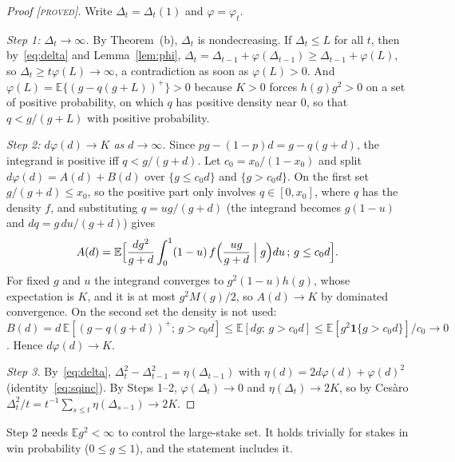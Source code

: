 \documentclass[aoas]{imsart}
\theoremstyle{plain}
\theoremstyle{definition}
\newcommand{\E}{\mathbb{E}}
\newcommand{\status}[1]{\textup{[\textsc{#1}]}}
\begin{document}
\begin{proof}[Proof \status{proved}]
Write $\Delta_t=\Delta_t(1)$ and $\varphi=\varphi_t$.

\emph{Step 1: $\Delta_t\to\infty$.} By Theorem~(b), $\Delta_t$ is nondecreasing. If $\Delta_t\le L$
for all $t$, then by~\eqref{eq:delta} and Lemma~\ref{lem:phi}, $\Delta_t=\Delta_{t-1}+\varphi(\Delta_{t-1})\ge
\Delta_{t-1}+\varphi(L)$, so $\Delta_t\ge t\varphi(L)\to\infty$, a contradiction as soon as $\varphi(L)>0$. And
$\varphi(L)=\E\{(g-q(g+L))^+\}>0$ because $K>0$ forces $h(g)g^2>0$ on a set of positive probability, on which $q$ has
positive density near $0$, so that $q<g/(g+L)$ with positive probability.

\emph{Step 2: $d\varphi(d)\to K$ as $d\to\infty$.} Since $pg-(1-p)d=g-q(g+d)$, the integrand is positive iff
$q<g/(g+d)$. Let $c_0=x_0/(1-x_0)$ and split $d\varphi(d)=A(d)+B(d)$ over $\{g\le c_0d\}$ and $\{g>c_0d\}$. On the
first set $g/(g+d)\le x_0$, so the positive part only involves $q\in[0,x_0]$, where $q$ has the density $f$, and
substituting $q=ug/(g+d)$ (the integrand becomes $g(1-u)$ and $dq=g\,du/(g+d)$) gives
\[ A(d)=\E\Bigl[\frac{dg^2}{g+d}\int_0^1(1-u)\,f\Bigl(\frac{ug}{g+d}\Bigm| g\Bigr)du\,;\,g\le c_0d\Bigr]. \]
For fixed $g$ and $u$ the integrand converges to $g^2(1-u)h(g)$, whose expectation is $K$, and it is at most
$g^2M(g)/2$, so $A(d)\to K$ by dominated convergence. On the second set the density is not used:
$B(d)=d\,\E[(g-q(g+d))^+;\,g>c_0d]\le\E[dg;\,g>c_0d]\le\E[g^2\mathbf1\{g>c_0d\}]/c_0\to0$. Hence $d\varphi(d)\to K$.

\emph{Step 3.} By~\eqref{eq:delta}, $\Delta_t^2-\Delta_{t-1}^2=\eta(\Delta_{t-1})$ with
$\eta(d)=2d\varphi(d)+\varphi(d)^2$ (identity~\eqref{eq:sqinc}). By Steps 1--2, $\varphi(\Delta_t)\to0$ and
$\eta(\Delta_t)\to2K$, so by Ces\`aro $\Delta_t^2/t=t^{-1}\sum_{s\le t}\eta(\Delta_{s-1})\to2K$.
\end{proof}

\noindent Step 2 needs $\E g^2<\infty$ to control the large-stake set. It holds trivially for stakes in win
probability ($0\le g\le1$), and the statement includes it.
\end{document}

